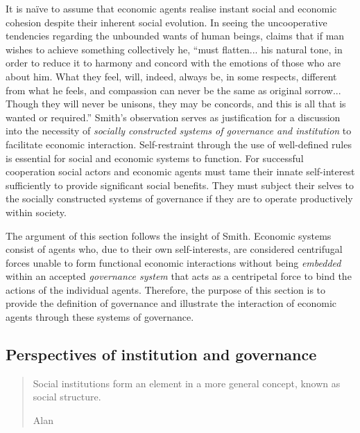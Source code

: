 It is na\"{i}ve to assume that economic agents realise instant social and economic cohesion despite their inherent social evolution. In seeing the uncooperative tendencies regarding the unbounded wants of human beings, \citet[p.~17]{Smith1759} claims that if man wishes to achieve something collectively he, ``must flatten... his natural tone, in order to reduce it to harmony and concord with the emotions of those who are about him. What they feel, will, indeed, always be, in some respects, different from what he feels, and compassion can never be the same as original sorrow... Though they will never be unisons, they may be concords, and this is all that is wanted or required.'' Smith's observation serves as justification for a discussion into the necessity of \emph{socially constructed systems of governance and institution} to facilitate economic interaction. Self-restraint through the use of well-defined rules is essential for social and economic systems to function. For successful cooperation social actors and economic agents must tame their innate self-interest sufficiently to provide significant social benefits. They must subject their selves to the socially constructed systems of governance if they are to operate productively within society.

The argument of this section follows the insight of Smith. Economic systems consist of agents who, due to their own self-interests, are considered centrifugal forces unable to form functional economic interactions without being \emph{embedded} within an accepted \emph{governance system} that acts as a centripetal force to bind the actions of the individual agents. Therefore, the purpose of this section is to provide the definition of governance and illustrate the interaction of economic agents through these systems of governance.

\subsection{Perspectives of institution and governance}

\begin{quote}
Social institutions form an element in a more general concept, known as social structure.

\begin{flushright}
Alan \citet[p.~3]{Wells1970}
\end{flushright}
\end{quote}

